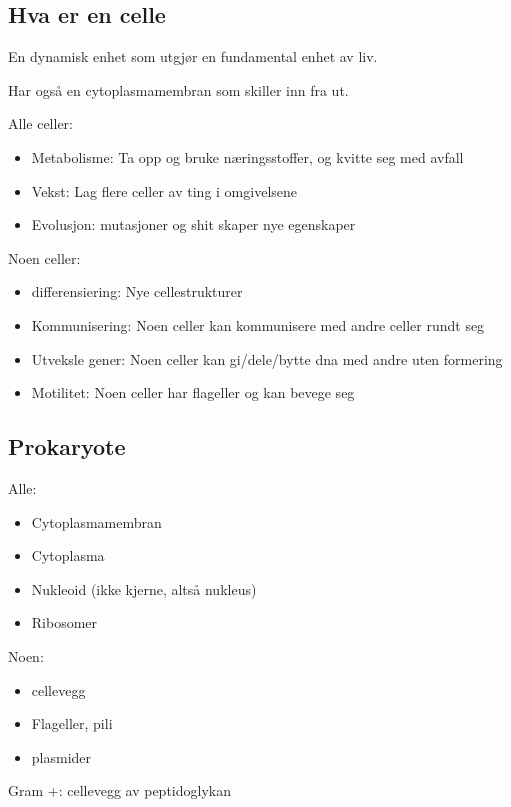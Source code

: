\subsection{Hva er en celle}
    En dynamisk enhet som utgjør en fundamental enhet av liv. 

    Har også en cytoplasmamembran som skiller inn fra ut. 

    Alle celler: 
    \begin{itemize}
        \item Metabolisme: Ta opp og bruke næringsstoffer, og kvitte seg med avfall
        \item Vekst: Lag flere celler av ting i omgivelsene
        \item Evolusjon: mutasjoner og shit skaper nye egenskaper
    \end{itemize}

    Noen celler: 
    \begin{itemize}
        \item differensiering: Nye cellestrukturer 
        \item Kommunisering: Noen celler kan kommunisere med andre celler rundt seg
        \item Utveksle gener: Noen celler kan gi/dele/bytte dna med andre uten formering
        \item Motilitet: Noen celler har flageller og kan bevege seg
    \end{itemize}


\subsection{Prokaryote}
    Alle: 
    \begin{itemize}
        \item Cytoplasmamembran
        \item Cytoplasma
        \item Nukleoid (ikke kjerne, altså nukleus)
        \item Ribosomer
    \end{itemize}

    Noen:
    \begin{itemize}
        \item cellevegg
        \item Flageller, pili
        \item plasmider
    \end{itemize}

    Gram +: cellevegg av peptidoglykan

